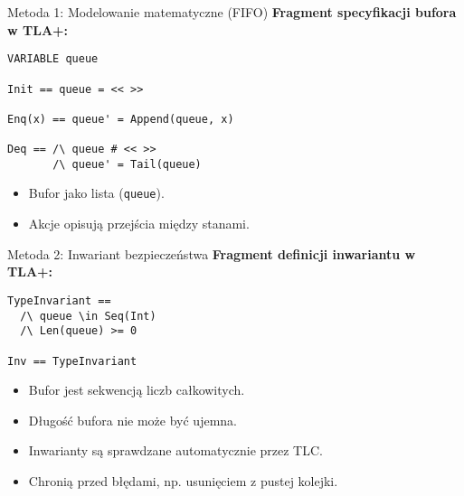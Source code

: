 \documentclass{beamer}
\begin{document}
\begin{frame}[fragile]{Metoda 1: Modelowanie matematyczne (FIFO)}
  \textbf{Fragment specyfikacji bufora w TLA+:}
  \vspace{0.5em}

  \begin{verbatim}
VARIABLE queue

Init == queue = << >>

Enq(x) == queue' = Append(queue, x)

Deq == /\ queue # << >>
       /\ queue' = Tail(queue)
  \end{verbatim}

  \vspace{0.1em}
  \begin{itemize}
    \item Bufor jako lista (\texttt{queue}).
    \item Akcje opisują przejścia między stanami.
  \end{itemize}
\end{frame}

  
  
\begin{frame}[fragile]{Metoda 2: Inwariant bezpieczeństwa}
  \textbf{Fragment definicji inwariantu w TLA+:}
  \vspace{0.5em}

  \begin{verbatim}
TypeInvariant ==
  /\ queue \in Seq(Int)
  /\ Len(queue) >= 0

Inv == TypeInvariant
  \end{verbatim}

  \vspace{0.1em}
  \begin{itemize}
    \item Bufor jest sekwencją liczb całkowitych.
    \item Długość bufora nie może być ujemna.
    \item Inwarianty są sprawdzane automatycznie przez TLC.
    \item Chronią przed błędami, np. usunięciem z pustej kolejki.
  \end{itemize}
\end{frame}
\end{document}
